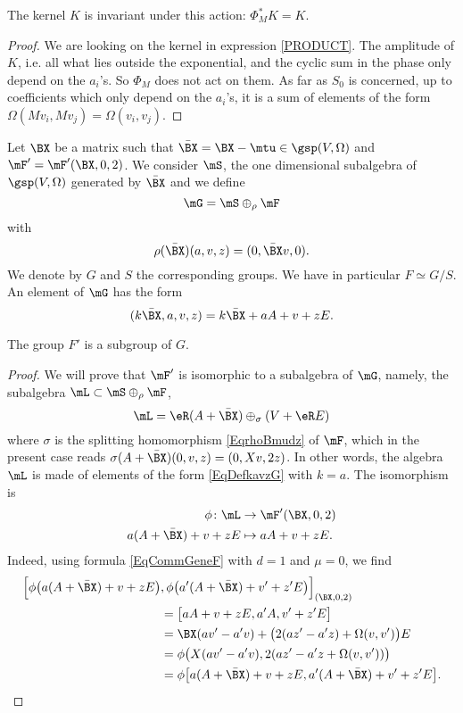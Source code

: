 \begin{proposition}
	The kernel $K$ is invariant under this action: $\Phi^*_{M}K=K$.
	\label{PropkernelinvarSp}
\end{proposition}

\begin{proof}
	We are looking on the kernel in expression \eqref{PRODUCT}. The amplitude of $K$, i.e. all what lies outside the exponential, and the cyclic sum in the phase only depend on the $a_{i}$'s. So $\Phi_{M}$ does not act on them. As far as $S_{0}$ is concerned, up to coefficients which only depend on the $a_{i}$'s, it is a sum of elements of the form $\Omega(Mv_{i},Mv_{j})=\Omega(v_{i},v_{j})$.
\end{proof}

Let $\BX $ be a matrix such that $\bar{\BX }=\BX -\mtu\in\gsp(V,\Omega)$ and $\mF'=\mF'(\BX,0,2)$. We consider $\mS$, the one dimensional subalgebra of $\gsp(V,\Omega)$ generated by $\bar{\BX}$ and we define
\begin{equation}
	\mG=\mS\oplus_{\rho}\mF
\end{equation}
with
\[
	\rho(\bar{\BX })(a,v,z)=(0,\bar{\BX }v,0).
\]
We denote by $G$ and $S$ the corresponding groups. We have in particular $F\simeq G/S$. An element of $\mG$ has the form
\begin{equation}    \label{EqDefkavzG}
	(k\bar\BX,a,v,z)=k\bar\BX+aA+v+zE.
\end{equation}


\begin{proposition}
	The group $F'$ is a subgroup of $G$.
\end{proposition}
\begin{proof}
	We will prove that $\mF'$ is isomorphic to a subalgebra of $\mG$, namely, the subalgebra $\mL\subset \mS\oplus_{\rho}\mF$,
	\[
		\mL=\eR(A+\bar\BX)\oplus_{\sigma}(V+\eR E)
	\]
	where $\sigma$ is the splitting homomorphism \eqref{EqrhoBmudz} of $\mF$, which in the present case reads $\sigma(A+\bar\BX)(0,v,z)=(0,Xv,2z)$. In other words, the algebra $\mL$ is made of elements of the form \eqref{EqDefkavzG} with $k=a$.  The isomorphism is
	\begin{equation}
		\begin{aligned}
			\phi  \colon \mL  & \to \mF'(\BX,0,2) \\
			a(A+\bar\BX)+v+zE & \mapsto aA+v+zE.
		\end{aligned}
	\end{equation}
	Indeed, using formula \eqref{EqCommGeneF} with $d=1$ and $\mu=0$, we find
	\[
		\begin{split}
			\Big[ \phi\big( a(A+\bar{\BX })+v+zE \big)&,\phi\big( a'(A+\bar{\BX })+v'+z'E \big) \Big]_{(\BX,0,2)}\\
			&=\big[ aA+v+zE,a'A,v'+z'E \big]\\
			&=\BX (av'-a'v)+\big(2(az'-a'z)+\Omega(v,v')\big)E\\
			&=\phi\big( X(av'-a'v),2(az'-a'z+\Omega(v,v'))  \big)\\
			&=\phi\big[ a(A+\bar{\BX })+v+zE,a'(A+\bar{\BX })+v'+z'E \big].
		\end{split}
	\]
\end{proof}

